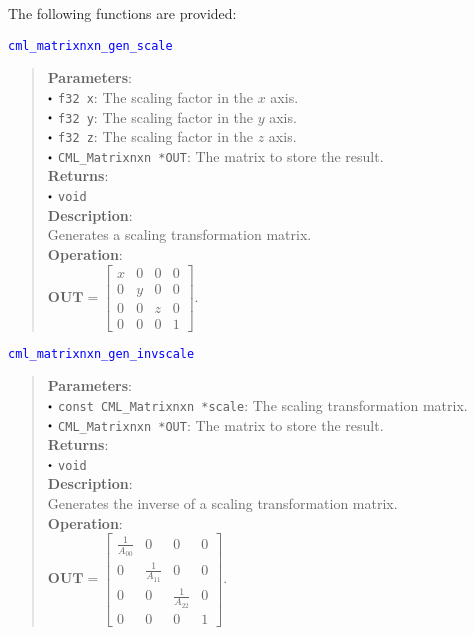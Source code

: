 \documentclass[a4paper,oneside,8pt]{extarticle}
\newcommand{\function}[1]{
  \noindent\textcolor{blue}{\texttt{#1}}
  \vspace{-0.3em}
}
\renewcommand{\dot}{\raisebox{0.3ex}{\scalebox{0.6}{$\bullet$}}}
\theoremstyle{definition}
\begin{document}
The following functions are provided: \newline

\function{cml\_matrixnxn\_gen\_scale}
\begin{quote}
  \textbf{Parameters}: \\
  $\dot$ \texttt{f32 x}: The scaling factor in the $x$ axis. \\
  $\dot$ \texttt{f32 y}: The scaling factor in the $y$ axis. \\
  $\dot$ \texttt{f32 z}: The scaling factor in the $z$ axis. \\
  $\dot$ \texttt{CML\_Matrixnxn *OUT}: The matrix to store the result. \\
  \textbf{Returns}: \\
  $\dot$ \texttt{void} \\

  \vspace{-0.75em}
  \textbf{Description}: \\
  Generates a scaling transformation matrix. \\

  \vspace{-0.75em}
  \textbf{Operation}: \\
  $\mathbf{OUT} = \begin{bmatrix}
  x & 0 & 0 & 0 \\
  0 & y & 0 & 0 \\
  0 & 0 & z & 0 \\
  0 & 0 & 0 & 1
  \end{bmatrix}$. \\
\end{quote}

\function{cml\_matrixnxn\_gen\_invscale}
\begin{quote}
  \textbf{Parameters}: \\
  $\dot$ \texttt{const CML\_Matrixnxn *scale}: The scaling transformation matrix. \\
  $\dot$ \texttt{CML\_Matrixnxn *OUT}: The matrix to store the result. \\
  \textbf{Returns}: \\
  $\dot$ \texttt{void} \\

  \vspace{-0.75em}
  \textbf{Description}: \\
  Generates the inverse of a scaling transformation matrix. \\

  \vspace{-0.75em}
  \textbf{Operation}: \\
  $\mathbf{OUT} = \begin{bmatrix}
  \frac{1}{A_{00}} & 0 & 0 & 0 \\
  0 & \frac{1}{A_{11}} & 0 & 0 \\
  0 & 0 & \frac{1}{A_{22}} & 0 \\
  0 & 0 & 0 & 1
  \end{bmatrix}$. \\
\end{quote}
\end{document}
